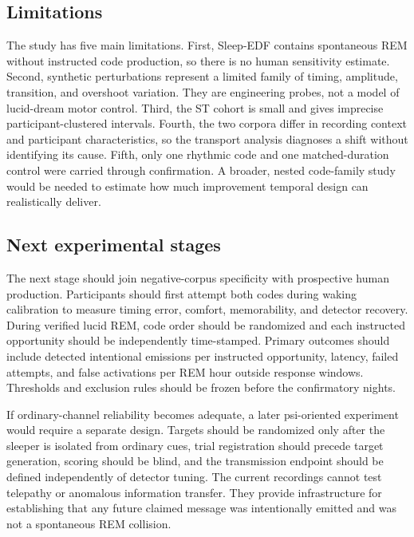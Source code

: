 \documentclass[10pt,twocolumn]{article}
\begin{document}
\subsection{Limitations}

The study has five main limitations. First, Sleep-EDF contains spontaneous REM without instructed code production, so there is no human sensitivity estimate. Second, synthetic perturbations represent a limited family of timing, amplitude, transition, and overshoot variation. They are engineering probes, not a model of lucid-dream motor control. Third, the ST cohort is small and gives imprecise participant-clustered intervals. Fourth, the two corpora differ in recording context and participant characteristics, so the transport analysis diagnoses a shift without identifying its cause. Fifth, only one rhythmic code and one matched-duration control were carried through confirmation. A broader, nested code-family study would be needed to estimate how much improvement temporal design can realistically deliver.

\subsection{Next experimental stages}

The next stage should join negative-corpus specificity with prospective human production. Participants should first attempt both codes during waking calibration to measure timing error, comfort, memorability, and detector recovery. During verified lucid REM, code order should be randomized and each instructed opportunity should be independently time-stamped. Primary outcomes should include detected intentional emissions per instructed opportunity, latency, failed attempts, and false activations per REM hour outside response windows. Thresholds and exclusion rules should be frozen before the confirmatory nights.

If ordinary-channel reliability becomes adequate, a later psi-oriented experiment would require a separate design. Targets should be randomized only after the sleeper is isolated from ordinary cues, trial registration should precede target generation, scoring should be blind, and the transmission endpoint should be defined independently of detector tuning. The current recordings cannot test telepathy or anomalous information transfer. They provide infrastructure for establishing that any future claimed message was intentionally emitted and was not a spontaneous REM collision.
\end{document}
